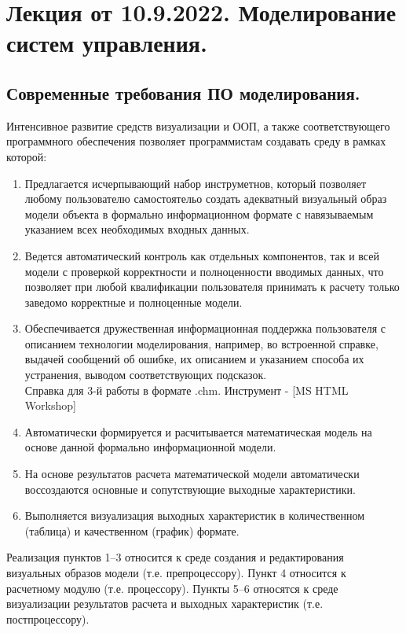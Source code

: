 \usepackage{amsmath}
\section{Лекция от 10.9.2022. Моделирование систем управления.}
\subsection{Современные требования ПО моделирования.}
Интенсивное развитие средств визуализации и ООП, а также соответствующего
программного обеспечения позволяет программистам создавать среду в рамках
которой:
\begin{enumerate}
  \item Предлагается исчерпывающий набор инструметнов, который позволяет любому
    пользователю самостоятельо создать адекватный визуальный образ модели
    объекта в формально информационном формате с навязываемым указанием всех
    необходимых входных данных.
  \item Ведется автоматический контроль как отдельных компонентов, так и всей
    модели с проверкой корректности и полноценности вводимых данных, что
    позволяет при любой квалификации пользователя принимать к расчету только
    заведомо корректные и полноценные модели.
  \item Обеспечивается дружественная информационная поддержка пользователя с
    описанием технологии моделирования, например, во встроенной справке, выдачей
    сообщений об ошибке, их описанием и указанием способа их устранения, выводом
    соответствующих подсказок.\\{\ttfamily Справка для 3-й работы в формате
    .chm. Инструмент - [MS HTML Workshop]}
  \item Автоматически формируется и расчитывается математическая модель на
    основе данной формально информационной модели.
  \item На основе результатов расчета математической модели автоматически
    воссоздаются основные и сопутствующие выходные характеристики.
  \item Выполняется визуализация выходных характеристик в
    количественном (таблица) и качественном (график) формате.
\end{enumerate}\par
Реализация пунктов 1--3 относится к среде создания и редактирования визуальных
образов модели (т.е. препроцессору). Пункт 4 относится к расчетному модулю (т.е.
процессору). Пункты 5--6 относятся к среде визуализации результатов расчета и
выходных характеристик (т.е. постпроцессору).\par

